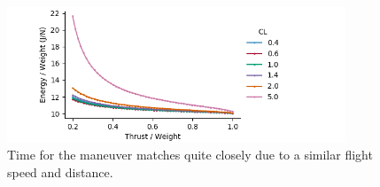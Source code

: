 \documentclass[10pt,english]{article}
\begin{document}
\begin{figure}[H]
\centering
\includegraphics[trim={.0cm 0.0cm .0cm 0cm},clip,width=0.9\textwidth]{Energy_TW_analytical}
\vspace{-5pt}
\caption{Time for the maneuver matches quite closely due to a similar flight speed and distance.}
\label{f:t_compare}
\end{figure}
\end{document}
